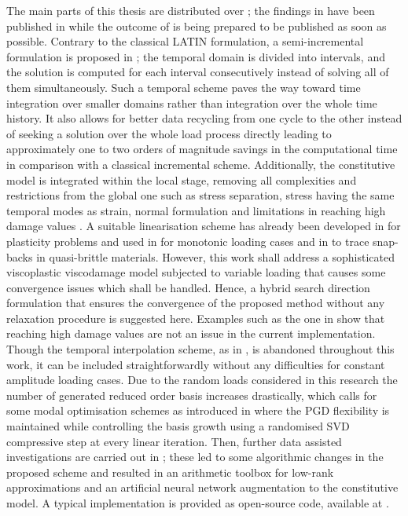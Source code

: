 The main parts of this thesis are distributed over ; the findings in  have been published in \parencite{bhattacharyya2019kinetic,Alameddin2017d,alameddin_book,Alameddin2019d,romfem} while the outcome of  is being prepared to be published as soon as possible. Contrary to the classical LATIN formulation, a semi-incremental formulation is proposed in ; the temporal domain is divided into intervals, and the solution is computed for each interval consecutively instead of solving all of them simultaneously. Such a temporal scheme paves the way toward time integration over smaller domains rather than integration over the whole time history. It also allows for better data recycling from one cycle to the other instead of seeking a solution over the whole load process directly leading to approximately one to two orders of magnitude savings in the computational time in comparison with a classical incremental scheme. Additionally, the constitutive model is integrated within the local stage, removing all complexities and restrictions from the global one such as stress separation, stress having the same temporal modes as strain, normal formulation and limitations in reaching high damage values \parencite{bhattacharyya2018model,ryckelynck2011robust}. A suitable linearisation scheme has already been developed in \parencite{Boisse1990,Boisse1991} for plasticity problems and used in \parencite{allix1989damage} for monotonic loading cases and in \parencite{vandoren2013novel} to trace snap-backs in quasi-brittle materials. However, this work shall address a sophisticated viscoplastic viscodamage model subjected to variable loading that causes some convergence issues which shall be handled. Hence, a hybrid search direction formulation that ensures the convergence of the proposed method without any relaxation procedure is suggested here. Examples such as the one in  show that reaching high damage values are not an issue in the current implementation. Though the temporal interpolation scheme, as in \parencite{bhattacharyya2018model}, is abandoned throughout this work, it can be included straightforwardly without any difficulties for constant amplitude loading cases. Due to the random loads considered in this research the number of generated reduced order basis increases drastically, which calls for some modal optimisation schemes as introduced in  where the PGD flexibility is maintained while controlling the basis growth using a randomised SVD compressive step at every linear iteration. Then, further data assisted investigations are carried out in ; these led to some algorithmic changes in the proposed scheme and resulted in an arithmetic toolbox for low-rank approximations and an artificial neural network augmentation to the constitutive model. A typical implementation is provided as open-source code, available at \parencite{romfem}.

